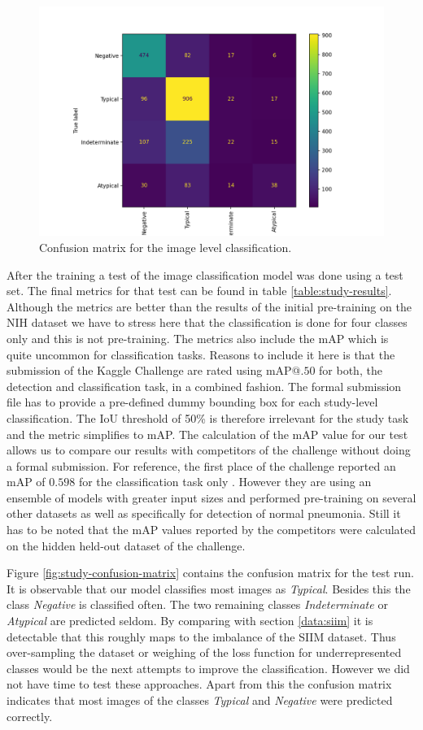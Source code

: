 \begin{figure}
	\centering
	\includegraphics[width=.7\linewidth]{img/confusion_study_58.png}
	\caption{Confusion matrix for the image level classification.}
	\label{fig:study-confusion-matrix}
\end{figure}

After the training a test of the image classification model was done using a test set. The final metrics for that test can be found in table \vref{table:study-results}. Although the metrics are better than the results of the initial pre-training on the NIH dataset we have to stress here that the classification is done for four classes only and this is not pre-training. The metrics also include the \ac{mAP} which is quite uncommon for classification tasks. Reasons to include it here is that the submission of the Kaggle Challenge are rated using \ac{mAP}@$.50$ for both, the detection and classification task, in a combined fashion. The formal submission file has to provide a pre-defined dummy bounding box for each study-level classification. The \ac{IoU} threshold of 50\% is therefore irrelevant for the study task and the metric simplifies to \ac{mAP}. The calculation of the \ac{mAP} value for our test allows us to compare our results with competitors of the challenge without doing a formal submission. For reference, the first place of the challenge reported an \ac{mAP} of $0.598$ for the classification task only \autocite{SIIMFirstPlace}. However they are using an ensemble of models with greater input sizes and performed pre-training on several other datasets as well as specifically for detection of normal pneumonia. Still it has to be noted that the \ac{mAP} values reported by the competitors were calculated on the hidden held-out dataset of the challenge.

Figure \vref{fig:study-confusion-matrix} contains the confusion matrix for the test run. It is observable that our model classifies most images as \textit{Typical}. Besides this the class \textit{Negative} is classified often. The two remaining classes \textit{Indeterminate} or \textit{Atypical} are predicted seldom. By comparing with section \vref{data:siim} it is detectable that this roughly maps to the imbalance of the SIIM dataset. Thus over-sampling the dataset or weighing of the loss function for underrepresented classes would be the next attempts to improve the classification. However we did not have time to test these approaches. Apart from this the confusion matrix indicates that most images of the classes \textit{Typical} and \textit{Negative} were predicted correctly.

